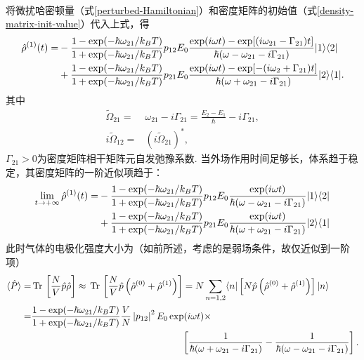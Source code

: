 \documentclass[a4paper, 10pt]{article}
\providecommand{\abs}[1]{\left\lvert#1\right\rvert} %
\providecommand{\tr}{\,\text{Tr}\,} %
\begin{document}
\begin{multicols}{2}
\begin{align}
\end{align}
\normalsize
将微扰哈密顿量（式\eqref{perturbed-Hamiltonian}）和密度矩阵的初始值（式\eqref{density-matrix-init-value}）代入上式，得
\tiny
\begin{align}
    \notag\hat{\rho}^{(1)}(t)=&-\frac{1-\exp(-\hbar\omega_{21}/k_BT)}{1+\exp(-\hbar\omega_{21}/k_BT)}p_{12}E_0\frac{\exp(i\omega t)-\exp[(i\omega_{21}-\Gamma_{21})t]}{\hbar(\omega-\omega_{21}-i\Gamma_{21})}\lvert 1\rangle\langle 2\rvert\\
    &+\frac{1-\exp(-\hbar\omega_{21}/k_BT)}{1+\exp(-\hbar\omega_{21}/k_BT)}p_{21}E_0\frac{\exp(i\omega t)-\exp[-(i\omega_{2}+\Gamma_{21})t]}{\hbar(\omega+\omega_{21}-i\Gamma_{21})}\lvert 2\rangle\langle 1\rvert.
\end{align}
\normalsize
其中
\begin{align}
    \tilde{\Omega}_{21}=&\omega_{21}-i\Gamma_{21}=\frac{E_2-E_1}{\hbar}-i\Gamma_{21},\\
    i\tilde{\Omega}_{12}=&\left(i\tilde{\Omega}_{21}\right)^*,
\end{align}
$\Gamma_{21}>0$为密度矩阵相干矩阵元自发弛豫系数.
当外场作用时间足够长，体系趋于稳定，其密度矩阵的一阶近似项趋于：
\scriptsize
\begin{align}
    \notag\lim_{t\rightarrow+\infty}\hat{\rho}^{(1)}(t)=&-\frac{1-\exp(-\hbar\omega_{21}/k_BT)}{1+\exp(-\hbar\omega_{21}/k_BT)}p_{12}E_0\frac{\exp(i\omega t)}{\hbar(\omega-\omega_{21}-i\Gamma_{21})}\lvert 1\rangle\langle 2\rvert\\
    &+\frac{1-\exp(-\hbar\omega_{21}/k_BT)}{1+\exp(-\hbar\omega_{21}/k_BT)}p_{21}E_0\frac{\exp(i\omega t)}{\hbar(\omega+\omega_{21}-i\Gamma_{21})}\lvert 2\rangle\langle 1\rvert
\end{align}
\normalsize
此时气体的电极化强度大小为（如前所述，考虑的是弱场条件，故仅近似到一阶项）
\tiny
\begin{align}
    \notag\langle\hat{P}\rangle=&\tr\left[\frac{N}{V}\hat{p}\hat{\rho}\right]\approx\tr\left[\frac{N}{V}\hat{p}\left(\hat{\rho}^{(0)}+\hat{\rho}^{(1)}\right)\right]=N\sum_{n=1,2}\langle n\rvert\left[N\hat{p}\left(\hat{\rho}^{(0)}+\hat{\rho}^{(1)}\right)\right]\lvert n\rangle\\
    \notag=&\frac{1-\exp(-\hbar\omega_{21}/k_BT)}{1+\exp(-\hbar\omega_{21}/k_BT)}\frac{V}{N}\abs{p_{12}}^2E_0\exp(i\omega t)\times\\
    &\qquad\qquad\qquad\qquad\qquad\qquad\qquad\qquad\left[\frac{1}{\hbar(\omega+\omega_{21}-i\Gamma_{21})}-\frac{1}{\hbar(\omega-\omega_{21}-i\Gamma_{21})}\right].
\end{align}

\end{multicols}
\end{document}
